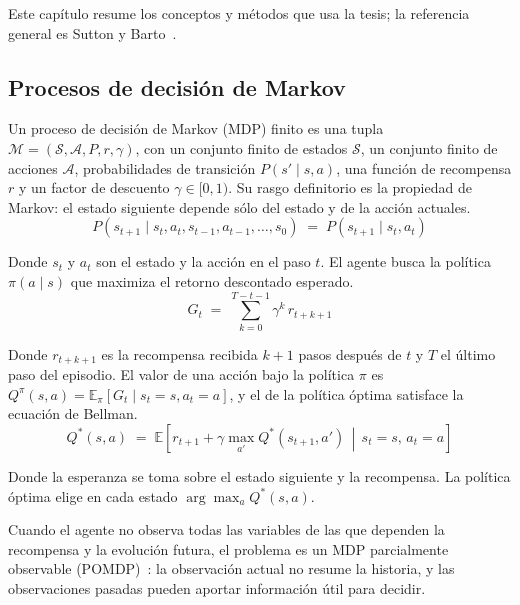 \documentclass[../00_Main/Main.tex]{subfiles}
\begin{document}
\label{sec:background}

Este cap\'itulo resume los conceptos y m\'etodos que usa la tesis; la referencia general es Sutton y
Barto~\citep{SuttonBarto2018}.

\subsection{Procesos de decisi\'on de Markov}\label{sec:mdp-bg}

Un proceso de decisi\'on de Markov (MDP) finito es una tupla
$\mathcal{M} = (\mathcal{S}, \mathcal{A}, P, r, \gamma)$, con un conjunto
finito de estados $\mathcal{S}$, un conjunto finito de acciones
$\mathcal{A}$, probabilidades de transici\'on $P(s' \mid s, a)$, una
funci\'on de recompensa $r$ y un factor de descuento $\gamma \in [0, 1)$.
Su rasgo definitorio es la propiedad de Markov: el estado siguiente
depende s\'olo del estado y de la acci\'on actuales.
\begin{equation}
P(s_{t+1} \mid s_t, a_t, s_{t-1}, a_{t-1}, \ldots, s_0)
\;=\; P(s_{t+1} \mid s_t, a_t)
\label{eq:markov}
\end{equation}

Donde $s_t$ y $a_t$ son el estado y la acci\'on en el paso $t$. El
agente busca la pol\'itica $\pi(a \mid s)$ que maximiza el retorno
descontado esperado.
\begin{equation}
G_t \;=\; \sum_{k=0}^{T-t-1} \gamma^{k}\, r_{t+k+1}
\label{eq:return}
\end{equation}

Donde $r_{t+k+1}$ es la recompensa recibida $k+1$ pasos despu\'es de $t$ y
$T$ el \'ultimo paso del episodio. El valor de una acci\'on bajo la
pol\'itica $\pi$ es $Q^{\pi}(s,a) = \mathbb{E}_{\pi}[G_t \mid s_t = s,
a_t = a]$, y el de la pol\'itica \'optima satisface la ecuaci\'on de
Bellman.
\begin{equation}
Q^{*}(s, a) \;=\; \mathbb{E}\!\left[r_{t+1} + \gamma \max_{a'}
Q^{*}(s_{t+1}, a') \,\middle|\, s_t = s,\, a_t = a\right]
\label{eq:bellman-opt}
\end{equation}

Donde la esperanza se toma sobre el estado siguiente y la recompensa. La
pol\'itica \'optima elige en cada estado $\arg\max_a Q^{*}(s, a)$.

Cuando el agente no observa todas las variables de las que dependen la
recompensa y la evoluci\'on futura, el problema es un MDP parcialmente
observable (POMDP)~\citep{Kaelbling1998}: la observaci\'on actual no
resume la historia, y las observaciones pasadas pueden aportar
informaci\'on \'util para decidir.
\end{document}
